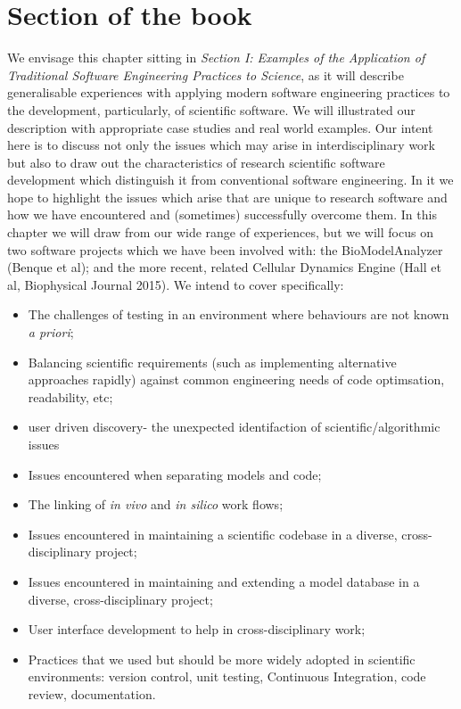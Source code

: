 \documentclass[a4paper,11pt]{article}
\begin{document}
\section*{Section of the book}

We envisage this chapter sitting in {\emph{Section I: Examples of the
Application of Traditional Software Engineering Practices to
Science}}, as it will describe generalisable experiences with applying
modern software engineering practices to the development, particularly, of
scientific software. We will illustrated our description with appropriate case
studies and real world examples. Our intent here is to discuss
not only the issues which may arise in interdisciplinary work 
but also to draw out the
characteristics of research scientific software development which 
distinguish it from conventional software engineering. In it we hope
to highlight the issues which arise that are unique to research software
and how we have encountered and (sometimes) successfully overcome 
them. In this chapter we will draw from our wide range of experiences, but
we will focus on two software projects which we have been involved with: 
the BioModelAnalyzer (Benque et al); and the more recent, related Cellular 
Dynamics Engine (Hall et al, Biophysical Journal 2015). We intend to cover 
specifically:

\begin{itemize}
\item The challenges of testing in an environment where behaviours 
	are not known \emph{a priori}; 
\item Balancing scientific requirements (such as implementing alternative 
	approaches rapidly) against common engineering needs of code optimsation, 
	readability, etc; \item user driven discovery- the unexpected identifaction of 
	scientific/algorithmic issues
\item Issues encountered when separating models and code; 
\item The linking of {\em in vivo} and {\em in silico} work flows;
\item Issues encountered in maintaining a scientific codebase in a diverse, 
cross-disciplinary project; 
\item Issues encountered in maintaining and extending a model database in a diverse, cross-disciplinary project;
\item User interface development to help in cross-disciplinary work;
\item Practices that we used but should be more widely adopted in scientific environments: version control, unit testing, Continuous Integration, code review, documentation. 
\end{itemize}
\end{document}
